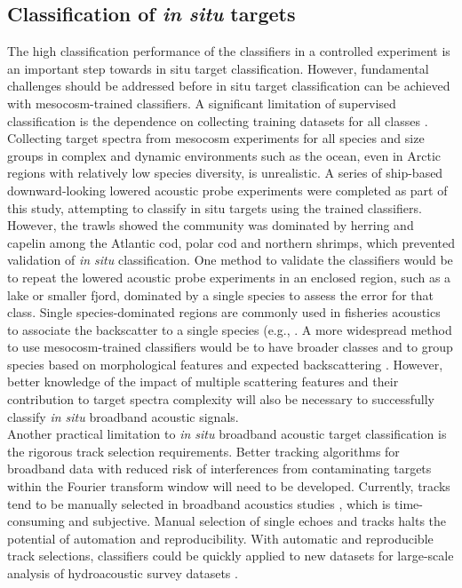 {\subsection{Classification of \textit{in situ} targets}
The high classification performance of the classifiers in a controlled experiment is an important step towards in situ target classification. However, fundamental challenges should be addressed before in situ target classification can be achieved with mesocosm-trained classifiers. A significant limitation of supervised classification is the dependence on collecting training datasets for all classes \citep{Handegard2021}. Collecting target spectra from mesocosm experiments for all species and size groups in complex and dynamic environments such as the ocean, even in Arctic regions with relatively low species diversity, is unrealistic. A series of ship-based downward-looking lowered acoustic probe experiments were completed as part of this study, attempting to classify in situ targets using the trained classifiers. However, the trawls showed the community was dominated by herring and capelin among the Atlantic cod, polar cod and northern shrimps, which prevented validation of \textit{in situ} classification. One method to validate the classifiers would be to repeat the lowered acoustic probe experiments in an enclosed region, such as a lake or smaller fjord, dominated by a single species to assess the error for that class. Single species-dominated regions are commonly used in fisheries acoustics to associate the backscatter to a single species (e.g., \citealt{Geoffroy2016, DeRobertis2019}. A more widespread method to use mesocosm-trained classifiers would be to have broader classes and to group species based on morphological features and expected backscattering \citep{Gugele2021}. However, better knowledge of the impact of multiple scattering features and their contribution to target spectra complexity will also be necessary to successfully classify \textit{in situ} broadband acoustic signals.\\
 Another practical limitation to \textit{in situ} broadband acoustic target classification is the rigorous track selection requirements. Better tracking algorithms for broadband data with reduced risk of interferences from contaminating targets within the Fourier transform window will need to be developed. Currently, tracks tend to be manually selected in broadband acoustics studies \citep{Khodabandeloo2021, Cotter2021, Dunning2023}, which is time-consuming and subjective. Manual selection of single echoes and tracks halts the potential of automation and reproducibility. With automatic and reproducible track selections, classifiers could be quickly applied to new datasets for large-scale analysis of hydroacoustic survey datasets \citep{Chawarski}.\\

}
